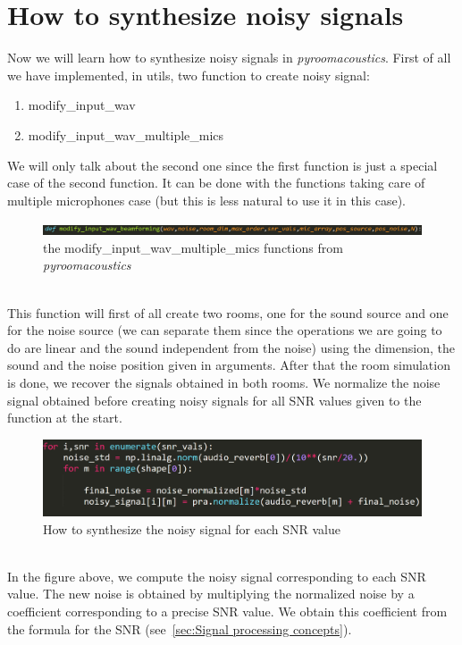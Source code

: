 \documentclass[11pt,a4paper,titlepage]{report}
\providecommand{\tightlist}{%
	\setlength{\itemsep}{0pt}\setlength{\parskip}{0pt}}
\begin{document}
\section{How to synthesize noisy signals}
\label{sec:synth}
\hspace*{0.6cm}
Now we will learn how to synthesize noisy signals in \textit{pyroomacoustics}. First of all we have implemented, in utils, two function to create noisy signal:
\begin{enumerate}
	\tightlist
	\item modify\_input\_wav
	\item modify\_input\_wav\_multiple\_mics
\end{enumerate}
We will only talk about the second one since the first function is just a special case of the second function. It can be done with the functions taking care of multiple microphones case (but this is less natural to use it in this case).\\
\begin{figure}[h!]
	\centering
	\includegraphics[width=0.7\linewidth]{Rapport9}
	\caption{the modify\_input\_wav\_multiple\_mics functions from \textit{pyroomacoustics}}
	\label{fig:rapport9}
\end{figure}\\
This function will first of all create two rooms, one for the sound source and one for the noise source (we can separate them since the operations we are going to do are linear and the sound independent from the noise) using the dimension, the sound and the noise position given in arguments. After that the room simulation is done, we recover the signals obtained in both rooms. We normalize the noise signal obtained before creating noisy signals for all SNR values given to the function at the start.
\begin{figure}[h!]
	\centering
	\includegraphics[width=0.7\linewidth]{Rapport10}
	\caption{How to synthesize the noisy signal for each SNR value}
	\label{fig:rapport10}
\end{figure}\\
In the figure above, we compute the noisy signal corresponding to each SNR value. The new noise is obtained by multiplying the normalized noise by a coefficient corresponding to a precise SNR value. We obtain this coefficient from the formula for the SNR (see~\ref{sec:Signal processing concepts}).
\end{document}
